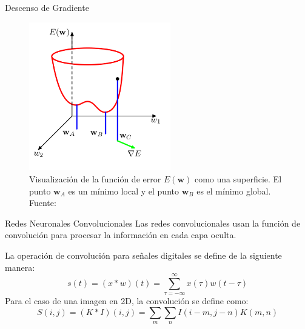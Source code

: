 \documentclass[10pt]{beamer}
\begin{document}
\begin{frame}{Descenso de Gradiente}
    \begin{figure}[!h] 
        \centering
        \includegraphics[width=0.55\textwidth]{../img/gradsup}
        \caption[Visualización de la función de error]{Visualización de la función de error $E(\mathbf{w})$ como una superficie. El punto $\mathbf{w}_A$ es un mínimo local y el punto $\mathbf{w}_B$ es el mínimo global. Fuente: \cite{Bishop2006} }
    \end{figure}
    
\end{frame}




\begin{frame}{Redes Neuronales Convolucionales}
    Las redes convolucionales usan la función de convolución para procesar 
    la información en cada capa oculta. 

    La operación de convolución para señales digitales se define de la siguiente manera:
    \begin{equation}
        s(t) = (x \ast w)(t) = \sum_{\tau=-\infty}^{\infty}x(\tau)w(t-\tau)
    \end{equation}
    Para el caso de una imagen en 2D, la convolución se define como:
    \begin{equation}
        S(i,j)=(K\ast I)(i,j) = \sum_{m} \sum_{n} I(i-m,j-n)K(m,n)
    \end{equation}

\end{frame}
\end{document}
